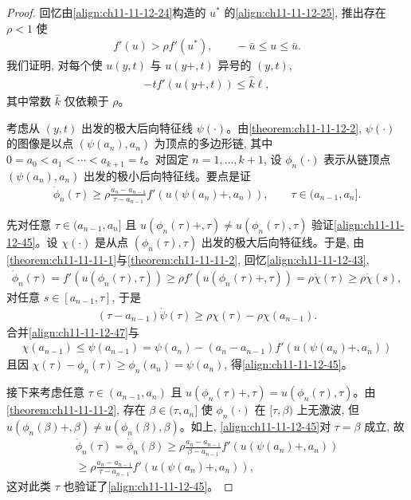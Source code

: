 \documentclass[../../main.tex]{subfiles}
\begin{document}
\begin{proof}
回忆由\eqref{align:ch11-11-12-24}构造的 $u^*$ 的\eqref{align:ch11-11-12-25}, 推出存在 $\rho<1$ 使
\begin{align}
f'(u)>\rho f'(u^*),\qquad -\bar u\leqslant u\leqslant\bar u.\label{align:ch11-11-12-43}
\end{align}
我们证明, 对每个使 $u(y,t)$ 与 $u(y+,t)$ 异号的 $(y,t)$,
\begin{align}
-t f'(u(y+,t))\leqslant\hat{k}\ell,\label{align:ch11-11-12-44}
\end{align}
其中常数 $\hat{k}$ 仅依赖于 $\rho$。

考虑从 $(y,t)$ 出发的极大后向特征线 $\psi(\cdot)$。由\cref{theorem:ch11-11-12-2}, $\psi(\cdot)$ 的图像是以点 $(\psi(a_n),a_n)$ 为顶点的多边形链, 其中 $0=a_0<a_1<\cdots<a_{k+1}=t$。对固定 $n=1,\ldots,k+1$, 设 $\phi_n(\cdot)$ 表示从链顶点 $(\psi(a_n),a_n)$ 出发的极小后向特征线。要点是证
\begin{align}
\dot{\phi}_n(\tau)\geqslant\rho\frac{a_n-a_{n-1}}{\tau-a_{n-1}}f'(u(\psi(a_n)+,a_n)),\qquad \tau\in(a_{n-1},a_n].\label{align:ch11-11-12-45}
\end{align}

先对任意 $\tau\in(a_{n-1},a_n]$ 且 $u(\phi_n(\tau)+,\tau)\neq u(\phi_n(\tau),\tau)$ 验证\eqref{align:ch11-11-12-45}。设 $\chi(\cdot)$ 是从点 $(\phi_n(\tau),\tau)$ 出发的极大后向特征线。于是, 由\cref{theorem:ch11-11-11-1}与\cref{theorem:ch11-11-11-2}, 回忆\eqref{align:ch11-11-12-43},
\begin{align}
\dot{\phi}_n(\tau)=f'(u(\phi_n(\tau),\tau))\geqslant\rho f'(u(\phi_n(\tau)+,\tau))=\rho\dot{\chi}(\tau)\geqslant\rho\dot{\chi}(s),\label{align:ch11-11-12-46}
\end{align}
对任意 $s\in[a_{n-1},\tau]$, 于是
\begin{align}
(\tau-a_{n-1})\dot{\psi}(\tau)\geqslant\rho\chi(\tau)-\rho\chi(a_{n-1}).\label{align:ch11-11-12-47}
\end{align}
合并\eqref{align:ch11-11-12-47}与
\begin{align}
\chi(a_{n-1})\leqslant\psi(a_{n-1})=\psi(a_n)-(a_n-a_{n-1})f'(u(\psi(a_n)+,a_n))\label{align:ch11-11-12-48}
\end{align}
且因 $\chi(\tau)-\phi_n(\tau)\geqslant\phi_n(a_n)=\psi(a_n)$, 得\eqref{align:ch11-11-12-45}。

接下来考虑任意 $\tau\in(a_{n-1},a_n)$ 且 $u(\phi_n(\tau)+,\tau)=u(\phi_n(\tau),\tau)$。由\cref{theorem:ch11-11-11-2}, 存在 $\beta\in(\tau,a_n]$ 使 $\phi_n(\cdot)$ 在 $[\tau,\beta)$ 上无激波, 但 $u(\phi_n(\beta)+,\beta)\neq u(\phi_n(\beta),\beta)$。如上, \eqref{align:ch11-11-12-45}对 $\tau=\beta$ 成立, 故
\begin{align}
\dot{\phi}_n(\tau)=\dot{\phi}_n(\beta)\geqslant\rho\frac{a_n-a_{n-1}}{\beta-a_{n-1}}f'(u(\psi(a_n)+,a_n))\nonumber\\
\geqslant\rho\frac{a_n-a_{n-1}}{\tau-a_{n-1}}f'(u(\psi(a_n)+,a_n)),\label{align:ch11-11-12-49}
\end{align}
这对此类 $\tau$ 也验证了\eqref{align:ch11-11-12-45}。


\end{proof}
\end{document}
